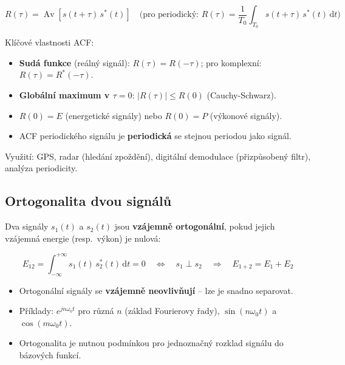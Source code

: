 \documentclass[12pt,a4paper]{article}
\newcommand{\Av}{\operatorname{Av}}
\newcommand{\dd}{\mathrm{d}}
\begin{document}
\begin{matBox}
\[
  R(\tau) = \Av\!\left[s(t+\tau)\,s^*(t)\right]
  \quad\text{(pro periodický: } R(\tau) = \frac{1}{T_0}\int_{T_0}s(t+\tau)\,s^*(t)\,\dd t\text{)}
\]
\end{matBox}

Klíčové vlastnosti ACF:
\begin{itemize}
  \item \textbf{Sudá funkce} (reálný signál): $R(\tau) = R(-\tau)$; pro komplexní: $R(\tau) = R^*(-\tau)$.
  \item \textbf{Globální maximum v $\tau = 0$}: $|R(\tau)| \leq R(0)$ (Cauchy-Schwarz).
  \item $R(0) = E$ (energetické signály) nebo $R(0) = P$ (výkonové signály).
  \item ACF periodického signálu je \textbf{periodická} se stejnou periodou jako signál.
\end{itemize}

Využití: GPS, radar (hledání zpoždění), digitální demodulace (přizpůsobený filtr), analýza periodicity.

\begin{hvezdBox}
\subsection*{Ortogonalita dvou signálů}
\end{hvezdBox}

Dva signály $s_1(t)$ a $s_2(t)$ jsou \textbf{vzájemně ortogonální}, pokud jejich vzájemná energie (resp.\ výkon) je nulová:

\begin{matBox}
\[
  E_{12} = \int_{-\infty}^{+\infty} s_1(t)\,s_2^*(t)\,\dd t = 0
  \quad \Leftrightarrow \quad
  s_1 \perp s_2
  \quad \Rightarrow \quad E_{1+2} = E_1 + E_2
\]
\end{matBox}

\begin{itemize}
  \item Ortogonální signály se \textbf{vzájemně neovlivňují} – lze je snadno separovat.
  \item Příklady: $e^{jn\omega_0 t}$ pro různá $n$ (základ Fourierovy řady), $\sin(n\omega_0 t)$ a $\cos(m\omega_0 t)$.
  \item Ortogonalita je nutnou podmínkou pro jednoznačný rozklad signálu do bázových funkcí.
\end{itemize}
\end{document}

